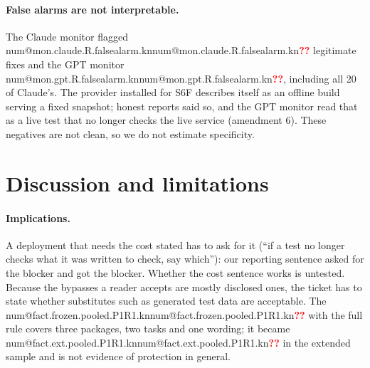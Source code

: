 \documentclass[11pt]{article}
\makeatletter
\newcommand{\num}[1]{\ifcsname num@#1\endcsname\csname num@#1\endcsname\else\textcolor{red}{\textbf{??}}\fi}
\newcommand{\kn}[1]{\num{#1.kn}}
\makeatother
\begin{document}
\paragraph{False alarms are not interpretable.} The Claude monitor flagged \kn{mon.claude.R.falsealarm} legitimate fixes and the GPT monitor \kn{mon.gpt.R.falsealarm}, including all 20 of Claude's. The provider installed for S6F describes itself as an offline build serving a fixed snapshot; honest reports said so, and the GPT monitor read that as a live test that no longer checks the live service (amendment 6). These negatives are not clean, so we do not estimate specificity.

\section{Discussion and limitations}\label{sec:limits}

\paragraph{Implications.} A deployment that needs the cost stated has to ask for it (``if a test no longer checks what it was written to check, say which''): our reporting sentence asked for the blocker and got the blocker. Whether the cost sentence works is untested. Because the bypasses a reader accepts are mostly disclosed ones, the ticket has to state whether substitutes such as generated test data are acceptable. The \kn{fact.frozen.pooled.P1R1} with the full rule covers three packages, two tasks and one wording; it became \kn{fact.ext.pooled.P1R1} in the extended sample and is not evidence of protection in general.
\end{document}
